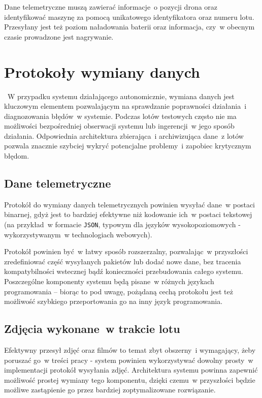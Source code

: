 Dane telemetryczne muszą zawierać informacje~o pozycji
drona oraz identyfikować maszynę za pomocą unikatowego
identyfikatora oraz numeru lotu. Przesyłany jest też
poziom naładowania baterii oraz informacja, czy~w obecnym
czasie prowadzone jest nagrywanie.

\section{Protokoły wymiany danych}
~W przypadku systemu działającego autonomicznie, wymiana danych jest kluczowym
elementem pozwalającym na sprawdzanie poprawności działania~i diagnozowania błędów~w systemie. Podczas lotów testowych
często nie ma możliwości bezpośredniej obserwacji systemu
lub ingerencji~w jego sposób działania. Odpowiednia architektura
zbierająca~i archiwizująca dane~z lotów pozwala znacznie szybciej 
wykryć potencjalne problemy~i zapobiec krytycznym błędom. 

\subsection{Dane telemetryczne}
Protokół do wymiany danych telemetrycznych powinien
wysyłać dane~w postaci binarnej, gdyż jest to bardziej
efektywne niż kodowanie ich~w postaci tekstowej (na
przykład~w formacie \texttt{JSON}, typowym dla języków
wysokopoziomowych - wykorzystywanym~w technologiach webowych).

Protokół powinien być~w łatwy sposób rozszerzalny,
pozwalając~w przyszłości zredefiniować część wysyłanych
pakietów lub dodać nowe dane, bez tracenia kompatybilności
wstecznej bądź konieczności przebudowania całego systemu.
Poszczególne komponenty systemu będą pisane~w różnych
językach programowania -- biorąc to pod uwagę, pożądaną
cechą protokołu jest też możliwość szybkiego przeportowania
go na inny język programowania. 

\subsection{Zdjęcia wykonane~w trakcie lotu} \label{functional_requirements_imagezmq}
Efektywny przesył zdjęć oraz filmów to temat zbyt obszerny~i
wymagający, żeby poruszać go~w treści pracy - system
powinien wykorzystywać dowolny prosty~w implementacji
protokół wysyłania zdjęć. Architektura systemu powinna
zapewnić możliwość prostej wymiany tego komponentu, dzięki
czemu~w przyszłości będzie możliwe zastąpienie go
przez bardziej zoptymalizowane rozwiązanie.

